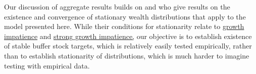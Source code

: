 \documentclass[BufferStockTheory]{subfiles}
\begin{document}
Our discussion of aggregate results builds on \cite{szeidlInvariant} and \cite{harmenbergInvariant} who give results on the existence and convergence of stationary wealth distributions that apply to the model presented here.
While their conditions for stationarity relate to \hyperlink{GIC}{growth impatience} and \hyperlink{GICMod}{strong growth impatience,} our objective is to establish existence of stable buffer stock targets, which is relatively easily tested empirically, rather than to establish stationarity of distributions, which is much harder to imagine testing with empirical data.


\ifSubfilesClassLoaded{ 
    
  }{}
\end{document}
